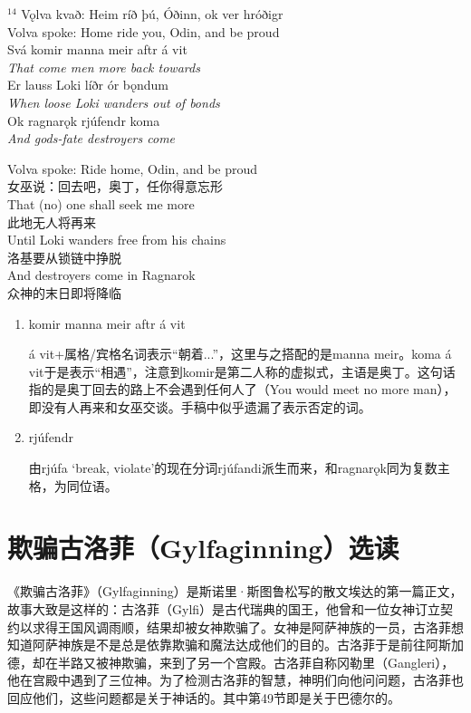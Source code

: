 \begin{paracol}{2}
    \noindent
    $^{14}$ Vǫlva kvað: Heim ríð þú, Óðinn, ok ver hróðigr\\
    Volva spoke: Home ride you, Odin, and be proud\\
    Svá komir manna meir aftr á vit\\
    \textit{That come men more back towards}\\
    Er lauss Loki líðr ór bǫndum\\
    \textit{When loose Loki wanders out of bonds} \\
    Ok ragnarǫk rjúfendr koma\\
    \textit{And gods-fate destroyers come}

    \switchcolumn
    \noindent
    Volva spoke: Ride home, Odin, and be proud\\
    女巫说：回去吧，奥丁，任你得意忘形\\
    That (no) one shall seek me more\\
    此地无人将再来\\
    Until Loki wanders free from his chains\\
    洛基要从锁链中挣脱\\
    And destroyers come in Ragnarok\\
    众神的末日即将降临
\end{paracol}
\begin{grammar*}{}
    \begin{enumerate}[leftmargin=*]
        \item komir manna meir aftr á vit

              á vit+属格/宾格名词表示“朝着...”，这里与之搭配的是manna meir。koma á vit于是表示“相遇”，注意到komir是第二人称的虚拟式，主语是奥丁。这句话指的是奥丁回去的路上不会遇到任何人了（You would meet no more man），即没有人再来和女巫交谈。手稿中似乎遗漏了表示否定的词。

        \item rjúfendr

              由rjúfa `break, violate'的现在分词rjúfandi派生而来，和ragnarǫk同为复数主格，为同位语。

    \end{enumerate}
\end{grammar*}
\section{欺骗古洛菲（Gylfaginning）选读}
《欺骗古洛菲》（Gylfaginning）是斯诺里·斯图鲁松写的散文埃达的第一篇正文，故事大致是这样的：古洛菲（Gylfi）是古代瑞典的国王，他曾和一位女神订立契约以求得王国风调雨顺，结果却被女神欺骗了。女神是阿萨神族的一员，古洛菲想知道阿萨神族是不是总是依靠欺骗和魔法达成他们的目的。古洛菲于是前往阿斯加德，却在半路又被神欺骗，来到了另一个宫殿。古洛菲自称冈勒里（Gangleri），他在宫殿中遇到了三位神。为了检测古洛菲的智慧，神明们向他问问题，古洛菲也回应他们，这些问题都是关于神话的。其中第49节即是关于巴德尔的。

